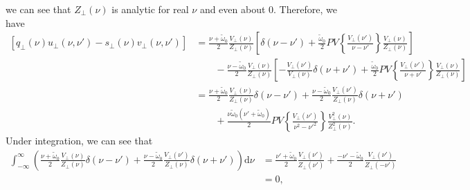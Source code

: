 \documentclass{article}
\begin{document}
we can see that $Z_\perp(\nu)$ is analytic for real $\nu$ and even about 0. Therefore, we have
\begin{equation}
\begin{split}
\left[q_\perp(\nu)u_\perp(\nu,\nu') - s_\perp(\nu)v_\perp(\nu,\nu')\right] &= \frac{\nu + \tilde{\omega}_0}{2}\frac{V_\perp(\nu)}{Z_\perp(\nu)}\left[\delta(\nu - \nu') + \frac{\tilde{\omega}_0}{2}PV\left\{\frac{V_\perp(\nu')}{\nu - \nu'}\right\}\frac{V_\perp(\nu)}{Z_\perp(\nu)}\right]\\
&\qquad - \frac{\nu - \tilde{\omega}_0}{2}\frac{V_\perp(\nu)}{Z_\perp(\nu)}\left[-\frac{V_\perp(\nu')}{V_\perp(\nu)}\delta(\nu + \nu') + \frac{\tilde{\omega}_0}{2}PV\left\{\frac{V_\perp(\nu')}{\nu + \nu'}\right\}\frac{V_\perp(\nu)}{Z_\perp(\nu)}\right]\\[0.5em]
&= \frac{\nu + \tilde{\omega}_0}{2}\frac{V_\perp(\nu)}{Z_\perp(\nu)}\delta(\nu - \nu') + \frac{\nu - \tilde{\omega}_0}{2}\frac{V_\perp(\nu')}{Z_\perp(\nu)}\delta(\nu + \nu')\\
&\qquad + \frac{\nu\tilde{\omega}_0(\nu' + \tilde{\omega}_0)}{2}PV\left\{\frac{V_\perp(\nu')}{\nu^2 - \nu'^2}\right\}\frac{V_\perp^2(\nu)}{Z_\perp^2(\nu)}.
\end{split}
\end{equation}
Under integration, we can see that
\begin{equation}
\begin{split}
\int_{-\infty}^\infty\left(\frac{\nu + \tilde{\omega}_0}{2}\frac{V_\perp(\nu)}{Z_\perp(\nu)}\delta(\nu - \nu') + \frac{\nu - \tilde{\omega}_0}{2}\frac{V_\perp(\nu')}{Z_\perp(\nu)}\delta(\nu + \nu')\right)\mathrm{d}\nu &= \frac{\nu' + \tilde{\omega}_0}{2}\frac{V_\perp(\nu')}{Z_\perp(\nu')} + \frac{-\nu' - \tilde{\omega}_0}{2}\frac{V_\perp(\nu')}{Z_\perp(-\nu')}\\
&= 0,
\end{split}
\end{equation}
\end{document}
